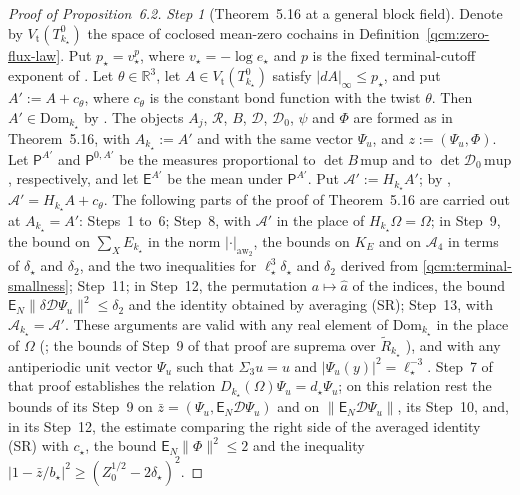 \documentclass[11pt,letterpaper,reqno]{amsart}
\theoremstyle{definition}
\begin{document}
\begin{proof}[Proof of Proposition~6.2]
\emph{Step 1} (Theorem~5.16 at a general block field).
Denote by $V_{\mathrm t}(T^0_{k_\star})$ the space of coclosed mean-zero cochains in Definition~\ref{qcm:zero-flux-law}. Put $p_\star=v_\star^p$, where $v_\star=-\log e_\star$ and $p$ is the fixed terminal-cutoff exponent of \cite[Proposition~24.1]{QEDConstruction}.
Let $\theta\in\mathbb R^3$, let $A\in V_{\mathrm t}(T^0_{k_\star})$ satisfy $|dA|_\infty\le p_\star$, and put $A':=A+c_\theta$, where $c_\theta$ is the constant bond function with the twist $\theta$.
Then $A'\in\mathrm{Dom}_{k_\star}$ by \cite[Proposition~10.4, Theorem~22.2 and Proposition~22.6]{QEDConstruction}.
The objects $A_j$, $\mathcal R$, $B$, $\mathcal D$, $\mathcal D_0$, $\psi$ and $\Phi$ are formed as in Theorem~5.16, with $A_{k_\star}:=A'$ and with the same vector $\Psi_u$, and $z:=(\Psi_u,\Phi)$.
Let $\mathsf P^{A'}$ and $\mathsf P^{0,A'}$ be the measures proportional to $\det B\,\mathrm{mup}$ and to $\det\mathcal D_0\,\mathrm{mup}$, respectively, and let $\mathsf E^{A'}$ be the mean under $\mathsf P^{A'}$.
Put $\mathscr A':=H_{k_\star}A'$;
by \cite[Proposition~10.1]{QEDConstruction}, $\mathscr A'=H_{k_\star}A+c_\theta$.
The following parts of the proof of Theorem~5.16 are carried out at $A_{k_\star}=A'$:
Steps~1 to~6;
Step~8, with $\mathscr A'$ in the place of $H_{k_\star}\Omega=\Omega$;
in Step~9, the bound on $\sum_XE_{k_\star}$ in the norm $|\cdot|_{\mathrm{aw}_2}$, the bounds on $K_E$ and on $\mathcal A_4$ in terms of $\delta_\star$ and $\delta_2$, and the two inequalities for $\ell_\star^3\delta_\star$ and $\delta_2$ derived from \eqref{qcm:terminal-smallness};
Step~11;
in Step~12, the permutation $a\mapsto\hat a$ of the indices, the bound $\mathsf E_N\|\delta\mathcal D\Psi_u\|^2\le\delta_2$ and the identity obtained by averaging (SR);
Step~13, with $\mathscr A_{k_\star}=\mathscr A'$.
These arguments are valid with any real element of $\mathrm{Dom}_{k_\star}$ in the place of $\Omega$ (\cite[Proposition~10.4 and equation~(21.28)]{QEDConstruction}; the bounds of Step~9 of that proof are suprema over $\tilde R_{k_\star}$ \cite[equation~(21.28)]{QEDConstruction}), and with any antiperiodic unit vector $\Psi_u$ such that $\Sigma_3u=u$ and $|\Psi_u(y)|^2=\ell_\star^{-3}$.
Step~7 of that proof establishes the relation $D_{k_\star}(\Omega)\Psi_u=d_\star\Psi_u$;
on this relation rest the bounds of its Step~9 on $\bar z=(\Psi_u,\mathsf E_N\mathcal D\Psi_u)$ and on $\|\mathsf E_N\mathcal D\Psi_u\|$, its Step~10, and, in its Step~12, the estimate comparing the right side of the averaged identity (SR) with $c_\star$, the bound $\mathsf E_N\|\Phi\|^2\le2$ and the inequality $|1-\bar z/b_\star|^2\ge(Z_0^{1/2}-2\delta_\star)^2$.

\end{proof}
\end{document}
